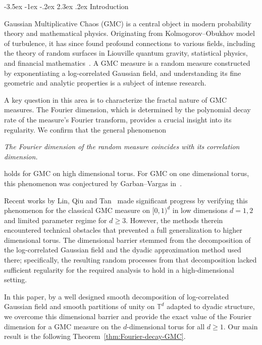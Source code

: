 \documentclass[12pt]{amsart}
\makeatletter
\theoremstyle{definition}
\theoremstyle{remark}
\newcommand{\T}{\mathbb{T}}
\renewcommand\section{\@startsection{section}{1}{\z@}%
	{-3.5ex \@plus -1ex \@minus -.2ex}%
	{2.3ex \@plus.2ex}%
	{\normalfont\large\bfseries}}%
\numberwithin{equation}{section}
\makeatother
\begin{document}
	
	\setcounter{tocdepth}{0}
	\setcounter{equation}{0}
	
	
	
	
	
\section{Introduction}\label{sec:intro}

Gaussian Multiplicative Chaos (GMC) is a central object in modern probability theory and mathematical physics. Originating from Kolmogorov--Obukhov model of turbulence, it has since found profound connections to various fields, including the theory of random surfaces in Liouville quantum gravity, statistical physics, and financial mathematics~\cite{RV14}. A GMC measure is a random measure constructed by exponentiating a log-correlated Gaussian field, and understanding its fine geometric and analytic properties is a subject of intense research.

A key question in this area is to characterize the fractal nature of GMC measures. The Fourier dimension, which is determined by the polynomial decay rate of the measure's Fourier transform, provides a crucial insight into its regularity. We confirm that the general phenomenon
\begin{center}
\textit{The Fourier dimension of the random measure coincides with its correlation dimension.}
\end{center}
holds for GMC on high dimensional torus. For GMC on one dimensional torus, this phenomenon was conjectured by Garban--Vargas in~\cite{GV23}.
	
Recent works by Lin, Qiu and Tan~\cite{LQT24,LQT25} made significant progress by verifying this phenomenon for the classical GMC measure on $[0,1)^d$ in low dimensions $d=1, 2$ and limited parameter regime for $d\ge 3$.
However, the methods therein encountered technical obstacles that prevented a full generalization to higher dimensional torus. The dimensional barrier stemmed from the decomposition of the log-correlated Gaussian field and the dyadic approximation method used there; specifically, the resulting random processes from that decomposition lacked sufficient regularity for the required analysis to hold in a high-dimensional setting. 

In this paper, by a well designed smooth decomposition of log-correlated Gaussian field and smooth partitions of unity on $\T^d$ adapted to dyadic structure, we overcome this dimensional barrier and provide the exact value of the Fourier dimension for a GMC measure on the $d$-dimensional torus for all $d \ge 1$. Our main result is  the following Theorem~\ref{thm:Fourier-decay-GMC}. 
\end{document}
